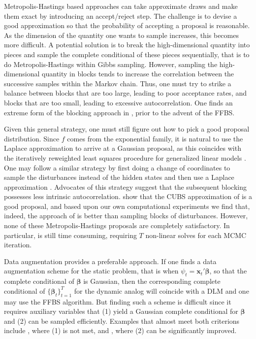\documentclass[12pt]{article}
\newcommand{\bbeta}{\boldsymbol{\beta}}
\newcommand{\vx}{\boldsymbol{x}}
\newcounter{parnum}
\newcommand{\npoint}{%
  \noindent\refstepcounter{parnum}%
  \makebox[0.5in][c]{\textbf{\arabic{parnum}.}} %
  \marginnote{\small\ttfamily\the\inputlineno}}
\renewcommand{\npoint}{}
\begin{document}
\npoint Metropolis-Hastings based approaches can take approximate draws and make
them exact by introducing an accept/reject step.  The challenge is to devise a
good approximation so that the probability of accepting a proposal is
reasonable.  As the dimension of the quantity one wants to sample increases,
this becomes more difficult.  A potential solution is to break the
high-dimensional quantity into pieces and sample the complete conditional of
these pieces sequentially, that is to do Metropolis-Hastings within Gibbs
sampling.  However, sampling the high-dimensional quantity in blocks tends to
increase the correlation between the successive samples within the Markov chain.
Thus, one must try to strike a balance between blocks that are too large,
leading to poor acceptance rates, and blocks that are too small, leading to
excessive autocorrelation.  One finds an extreme form of the blocking approach
in \cite{carlin-etal-1992}, prior to the advent of the FFBS.

\npoint Given this general strategy, one must still figure out how to pick a
good proposal distribution.  Since $f$ comes from the exponential family, it is
natural to use the Laplace approximation to arrive at a Gaussian proposal, as
this coincides with the iteratively reweighted least squares procedure for
generalized linear models \citep{gamerman-1997}.  One may follow a similar
strategy by first doing a change of coordinates to sample the disturbances
instead of the hidden states and then use a Laplace approximation
\citep{gamerman-1998, shephard-pitt-1997}.  Advocates of this strategy suggest
that the subsequent blocking possesses less intrinsic autocorrelation.
\cite{migon-etal-2013} show that the CUBS approximation of \cite{west-etal-1985}
is a good proposal, and based upon our own computational experiments we find
that, indeed, the approach of \cite{migon-etal-2013} is better than sampling
blocks of disturbances.  However, none of these Metropolis-Hastings proposals
are completely satisfactory.  In particular, \cite{migon-etal-2013} is still
time consuming, requiring $T$ non-linear solves for each MCMC iteration.

\npoint Data augmentation provides a preferable approach.  If one finds a data
augmentation scheme for the static problem, that is when $\psi_t = \vx_t'
\bbeta$, so that the complete conditional of $\bbeta$ is Gaussian, then the
corresponding complete conditional of $\{\bbeta_t\}_{t=1}^T$ for the dynamic
analog will coincide with a DLM and one may use the FFBS algorithm.
\npoint But finding such a scheme is difficult since it requires auxiliary
variables that (1) yield a Gaussian complete conditional for $\bbeta$ and (2)
can be sampled efficiently.  Examples that almost meet both criterions include
\cite{mcfadden-1974}, where (1) is not met, and \cite{holmes-held-2006}, where
(2) can be significantly improved.
\end{document}

